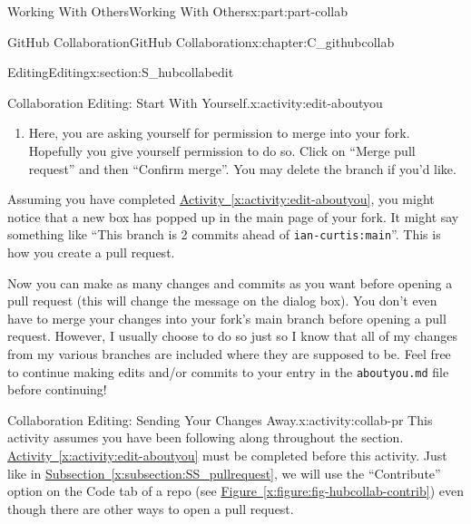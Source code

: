 \documentclass[oneside,10pt,]{book}
\newcommand{\xreffont}{\relax}
\newcommand{\mono}[1]{\texttt{#1}}
\begin{document}
\begin{partptx}{Working With Others}{}{Working With Others}{}{}{x:part:part-collab}
\begin{chapterptx}{GitHub Collaboration}{}{GitHub Collaboration}{}{}{x:chapter:C_githubcollab}
\begin{sectionptx}{Editing}{}{Editing}{}{}{x:section:S_hubcollabedit}
\begin{activity}{Collaboration Editing: Start With Yourself.}{x:activity:edit-aboutyou}
\begin{enumerate}[font=\bfseries,label=(\alph*),ref=\alph*]
\begin{quote}
\mono{base: main}\faArrowLeft{}\mono{compare: <your-branch-name>}.\end{quote}
 This means that you are taking your branch and attempting to merge your changes into the main branch from the ``base'' repository, or \emph{your repo}.%
\par
Like before, if you scroll down, you can see all of the changes you made. Later, I will be able to see this too, to make sure that you only changed what you were supposed to and didn't write anything R-rated.%
\par
Now you can create the pull request.%
\item{}Here, you are asking yourself for permission to merge into your fork. Hopefully you give yourself permission to do so. Click on ``Merge pull request'' and then ``Confirm merge''. You may delete the branch if you'd like.%
\end{enumerate}
\end{activity}%
Assuming you have completed \hyperref[x:activity:edit-aboutyou]{Activity~{\xreffont\ref{x:activity:edit-aboutyou}}}, you might notice that a new box has popped up in the main page of your fork. It might say something like ``This branch is 2 commits ahead of \mono{ian-curtis:main}''. This is how you create a pull request.%
\par
Now you can make as many changes and commits as you want before opening a pull request (this will change the message on the dialog box). You don't even have to merge your changes into your fork's main branch before opening a pull request. However, I usually choose to do so just so I know that all of my changes from my various branches are included where they are supposed to be. Feel free to continue making edits and\slash{}or commits to your entry in the \mono{aboutyou.md} file before continuing!%
\begin{activity}{Collaboration Editing: Sending Your Changes Away.}{x:activity:collab-pr}%
%
%
%
%
%
%
This activity assumes you have been following along throughout the section. \hyperref[x:activity:edit-aboutyou]{Activity~{\xreffont\ref{x:activity:edit-aboutyou}}} must be completed before this activity. Just like in \hyperref[x:subsection:SS_pullrequest]{Subsection~{\xreffont\ref{x:subsection:SS_pullrequest}}}, we will use the ``Contribute'' option on the Code tab of a repo (see \hyperref[x:figure:fig-hubcollab-contrib]{Figure~{\xreffont\ref{x:figure:fig-hubcollab-contrib}}}) even though there are other ways to open a pull request.%

\end{activity}
\end{sectionptx}
\end{chapterptx}
\end{partptx}
\end{document}
